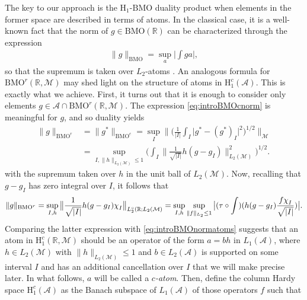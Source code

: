 \documentclass[psamsfonts]{amsart}
\newcommand*{\bigchi}{\mbox{\large$\chi$}}
\newcommand{\Lone}{L_1}
\newcommand{\Ltwo}{L_2}
\newcommand{\Ltwozero}{L_2^\circ}
\newcommand{\Hone}{\mathrm{H}_1}
\newcommand{\Honec}{\mathrm{H}_1^c}
\newcommand{\BMOc}{\mathrm{BMO}^c}
\newcommand{\BMOr}{\mathrm{BMO}^r}
\newcommand{\BMO}{\mathrm{BMO}}
\newcommand{\Hardyc}{\Honec(\mathcal{A})}
\begin{document}
    The key to our approach is the $\Hone$-$\BMO$ duality product when elements in the former space are described in terms of atoms. In the classical case, it is a well-known fact that the norm of $g\in \BMO(\mathbb{R})$ can be characterized through the expression
    \begin{align}\label{eq:introBMOnormatoms}\tag{atBMO}
        \|g\|_{\BMO} = \sup_{a} \big| \int g a \big|,
    \end{align}
    so that the supremum is taken over $\Ltwo$-atoms \cite{GR85,Mey90,MeyC97}. An analogous formula for $\BMOr(\mathbb{R},\mathcal{M})$ may shed light on the structure of atoms in $\Hardyc$.  This is exactly what we achieve. First, it turns out that it is enough to consider only elements $g\in\mathcal{A} \cap \BMOr(\mathbb{R},\mathcal{M})$. The expression \eqref{eq:introBMOcnorm} is meaningful for $g$, and so duality yields
    \begin{align*}
        \|g\|_{\BMOr} &= \|g^*\|_{\BMOc} = \sup_{I} \Big\| \Big( \frac{1}{|I|} \int_I \big| g^* - (g^*)_I \big|^2 \Big)^{1/2} \Big\|_{\mathcal{M}} 
        \\ & = \sup_{I,\|h\|_{\Ltwo(\mathcal M)}\leq 1} \Big( \int_I \|\frac{1}{\sqrt{|I|}} h (g - g_I)\|^2_{\Ltwo(\mathcal{M})} \Big)^{1/2}.
    \end{align*}
    with the supremum taken over $h$ in the unit ball of $\Ltwo(\mathcal{M})$. Now, recalling that $g - g_I$ has zero integral over $I$, it follows that
    $$
        \|g\|_{\BMOr} = \sup_{I,h} \big\| \frac{1}{\sqrt{|I|}} h (g - g_I) \bigchi_I \big\|_{\Ltwozero(\mathbb{R};\Ltwo(\mathcal{M})} = \sup_{I,h} \sup_{\|f\|_{\Ltwo} \leq 1} \big| (\tau \circ \int)(h (g-g_I) \frac{f \bigchi_I}{\sqrt{|I|}})\big|.$$
    Comparing the latter expression with \eqref{eq:introBMOnormatoms} suggests that an atom in $\Honec(\mathbb{R},\mathcal{M})$ should be an operator of the form $a = b h$ in $\Lone(\mathcal{A})$,  where $h \in \Ltwo(\mathcal{M})$ with $\|h\|_{\Ltwo(\mathcal{M})} \leq 1$ and $b \in \Ltwo(\mathcal{A})$ is supported on some interval $I$ and has an additional cancellation over $I$ that we will make precise later.
In  what follows, $a$ will be called a \emph{$c$-atom}. Then, define the column Hardy space $\Hardyc$ as the Banach subspace of $\Lone(\mathcal{A})$ of those operators $f$ such that
\end{document}
